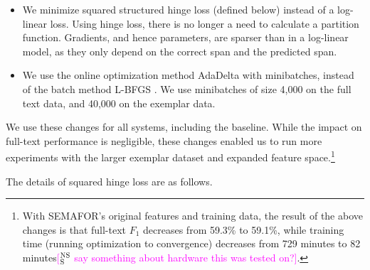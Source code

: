 \documentclass[11pt,a4paper]{article}
\DeclareMathOperator*{\argmax}{arg\,max}
\newcommand{\ensuretext}[1]{#1}
\newcommand{\nssmarker}{\ensuretext{\textcolor{magenta}{\ensuremath{^{\textsc{NS}}_{\textsc{S}}}}}}
\newcommand{\mkmarker}{\ensuretext{\textcolor{mdgreen}{\ensuremath{^{\textsc{M}}_{\textsc{K}}}}}}
\newcommand{\stmarker}{\ensuretext{\textcolor{blue}{\ensuremath{^{\textsc{S}}_{\textsc{T}}}}}}
\newcommand{\arkcomment}[3]{\ensuretext{\textcolor{#3}{[#1 #2]}}}
\newcommand{\nss}[1]{\arkcomment{\nssmarker}{#1}{magenta}}
\newcommand{\mk}[1]{\arkcomment{\mkmarker}{#1}{mdgreen}}
\newcommand{\st}[1]{\arkcomment{\stmarker}{#1}{blue}}
\begin{document}
\begin{itemize}
  \item We minimize squared structured hinge loss (defined below) instead of a log-linear loss.
  Using hinge loss, there is no longer a need to calculate a partition function.
  Gradients, and hence parameters, are sparser than in a log-linear model, as they only depend on the correct span and the predicted span.
  \item We use the online optimization method AdaDelta \citep{zeiler-12} with minibatches, instead of the batch method L-BFGS \citep{liu-89}.
  We use minibatches of size 4,000  on the full text data, and 40,000 on the exemplar data.
\end{itemize}
We use these changes for all systems, including the baseline.
While the impact on full-text performance is negligible, 
these changes enabled us to run more experiments with the larger exemplar dataset and expanded feature space.\footnote{With SEMAFOR's original features and training data, 
the result of the above changes is that full-text $F_1$ decreases from 59.3\% to 59.1\%, 
while training time (running optimization to convergence) 
decreases from 729 minutes to 82 minutes\nss{say something about hardware this was tested on?}.%
} 

% 

The details of squared hinge loss are as follows.
\end{document}
